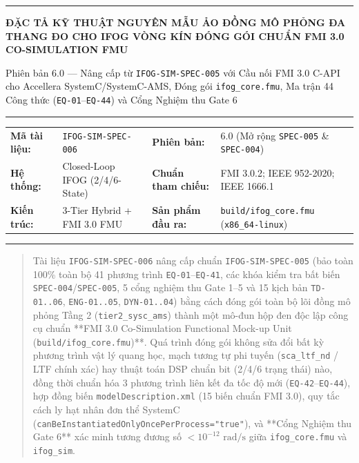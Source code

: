 \documentclass[11pt, a4paper]{article}
\begin{document}
\thispagestyle{plain}
{\color{primaryblue}\rule{\textwidth}{1.5pt}}
\vspace{0.3cm}

{\Large\bfseries\color{primaryblue} ĐẶC TẢ KỸ THUẬT NGUYÊN MẪU ẢO ĐỒNG MÔ PHỎNG ĐA THANG ĐO CHO IFOG VÒNG KÍN ĐÓNG GÓI CHUẨN FMI 3.0 CO-SIMULATION FMU}

\vspace{0.15cm}
{\normalsize\color{mutedgray} Phiên bản 6.0 --- Nâng cấp từ \texttt{IFOG-SIM-SPEC-005} với Cầu nối FMI 3.0 C-API cho Accellera SystemC/SystemC-AMS, Đóng gói \texttt{ifog\_core.fmu}, Ma trận 44 Công thức (\texttt{EQ-01}--\texttt{EQ-44}) và Cổng Nghiệm thu Gate 6}

\vspace{0.2cm}
{\color{rulegray}\rule{\textwidth}{0.6pt}}
\vspace{0.15cm}

\begin{tabular}{@{}l L{4.7cm} l L{5.1cm}@{}}
\textbf{Mã tài liệu:} & \texttt{IFOG-SIM-SPEC-006} & \textbf{Phiên bản:} & 6.0 (Mở rộng \texttt{SPEC-005} \& \texttt{SPEC-004}) \\
\textbf{Hệ thống:} & Closed-Loop IFOG (2/4/6-State) & \textbf{Chuẩn tham chiếu:} & FMI 3.0.2; IEEE 952-2020; IEEE 1666.1 \\
\textbf{Kiến trúc:} & 3-Tier Hybrid + FMI 3.0 FMU & \textbf{Sản phẩm đầu ra:} & \texttt{build/ifog\_core.fmu} (\texttt{x86\_64-linux}) \\
\end{tabular}

\vspace{0.15cm}
{\color{primaryblue}\rule{\textwidth}{1.0pt}}
\vspace{0.25cm}

\begin{abstract}
\noindent Tài liệu \texttt{IFOG-SIM-SPEC-006} nâng cấp chuẩn \texttt{IFOG-SIM-SPEC-005} (bảo toàn 100\% toàn bộ 41 phương trình \texttt{EQ-01}--\texttt{EQ-41}, các khóa kiểm tra bất biến \texttt{SPEC-004}/\texttt{SPEC-005}, 5 cổng nghiệm thu Gate 1--5 và 15 kịch bản \texttt{TD-01..06}, \texttt{ENG-01..05}, \texttt{DYN-01..04}) bằng cách đóng gói toàn bộ lõi đồng mô phỏng Tầng 2 (\texttt{tier2\_sysc\_ams}) thành một mô-đun hộp đen độc lập công cụ chuẩn **FMI 3.0 Co-Simulation Functional Mock-up Unit (\texttt{build/ifog\_core.fmu})**. Quá trình đóng gói không sửa đổi bất kỳ phương trình vật lý quang học, mạch tương tự phi tuyến (\texttt{sca\_ltf\_nd} / LTF chính xác) hay thuật toán DSP chuẩn bit (2/4/6 trạng thái) nào, đồng thời chuẩn hóa 3 phương trình liên kết đa tốc độ mới (\texttt{EQ-42}--\texttt{EQ-44}), hợp đồng biến \texttt{modelDescription.xml} (15 biến chuẩn FMI 3.0), quy tắc cách ly hạt nhân đơn thể SystemC (\texttt{canBeInstantiatedOnlyOncePerProcess="true"}), và **Cổng Nghiệm thu Gate 6** xác minh tương đương số $< 10^{-12}\text{ rad/s}$ giữa \texttt{ifog\_core.fmu} và \texttt{ifog\_sim}.
\end{abstract}
\end{document}
